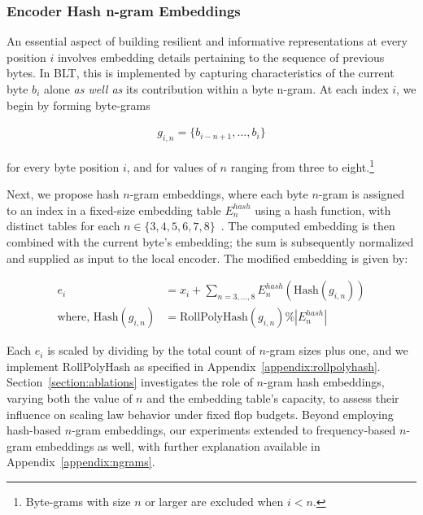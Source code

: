 \subsubsection{Encoder Hash n-gram Embeddings}
\label{sec:ngram-emb}
\label{sec:hash-emb}
An essential aspect of building resilient and informative representations at every position $i$ involves embedding details pertaining to the sequence of previous bytes. In {\textsc BLT}, this is implemented by capturing characteristics of the current byte $b_i$ alone \textit{as well as} its contribution within a byte n-gram. At each index $i$, we begin by forming byte-grams

\begin{align}
    g_{i,n}=\{b_{i-n + 1},\ldots, b_i\}
\end{align}

for every byte position $i$, and for values of $n$ ranging from three to eight.\footnote{
Byte-grams with size $n$ or larger are excluded when $i<n$.
}

Next, we propose hash $n$-gram embeddings, where each byte $n$-gram is assigned to an index in a fixed-size embedding table $E_{n}^{hash}$ using a hash function, with distinct tables for each $n \in\{3,4,5,6,7,8\}$~\citep{bai2010learning}. The computed embedding is then combined with the current byte’s embedding; the sum is subsequently normalized and supplied as input to the local encoder. The modified embedding is given by:

\begin{align}
e_i &= x_i + \sum_{n = 3,...,8}E_{n}^{hash}(\text{Hash}(g_{i,n})) \\
\text{where, Hash}(g_{i,n}) &= \text{RollPolyHash}(g_{i,n}) \% |E_{n}^{hash}|
\end{align}

Each $e_i$ is scaled by dividing by the total count of $n$-gram sizes plus one, and we implement RollPolyHash as specified in Appendix~\ref{appendix:rollpolyhash}. Section~\ref{section:ablations} investigates the role of $n$-gram hash embeddings, varying both the value of $n$ and the embedding table's capacity, to assess their influence on scaling law behavior under fixed flop budgets. Beyond employing hash-based $n$-gram embeddings, our experiments extended to frequency-based $n$-gram embeddings as well, with further explanation available in Appendix~\ref{appendix:ngrams}.

